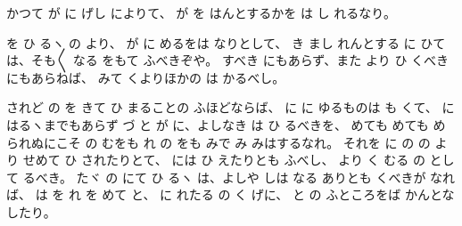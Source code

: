 
かつて
が
に
げし
によりて、
が
を
はんとするかを
は
し
れるなり。

を
ひ
るヽ
の
より、
が
に
めるをは
なりとして、
き
まし
れんとする
に
ひては、そも〳〵
なる
をもて
ふべきぞや。
すべき
にもあらず、また
より
ひ
くべき
にもあらねば、
みて
くよりほかの
は
かるべし。

されど
の
を
きて
ひ
まることの
ふほどならば、
に
に
ゆるものは
も
くて、
に
はるヽまでもあらず
づ
と
が
に、よしなき
は
ひ
るべきを、
めても
めても
められぬにこそ
の
むをも
れ
の
をも
みで
み
みはするなれ。
それを
に
の
の
より
せめて
ひ
されたりとて、
には
ひ
えたりとも
ふべし、
より
く
むる
の
として
るべき。
たヾ
の
にて
ひ
るヽ
は、よしや
しは
なる
ありとも
くべきが
なれば、
は
を
れ
を
めて
と、
に
れたる
の
く
げに、
と
の
ふところをば
かんとなしたり。

